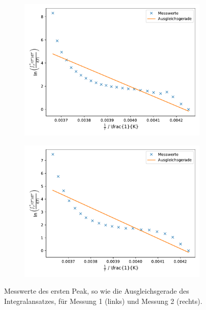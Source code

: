 \begin{figure}
    \centering
    \begin{subfigure}[b]{0.49\textwidth}
        \centering
        \includegraphics[width= \textwidth]{plots/int_1.5grad.pdf}
    \end{subfigure}
    \hfill
    \begin{subfigure}[b]{0.49\textwidth}
        \centering
        \includegraphics[width= \textwidth]{plots/int_2grad.pdf}
    \end{subfigure}
    \caption{Messwerte des ersten Peak, so wie die Ausgleichsgerade des Integralansatzes, für Messung 1 (links) und Messung 2 (rechts).}
    \label{fig:4}
\end{figure}






